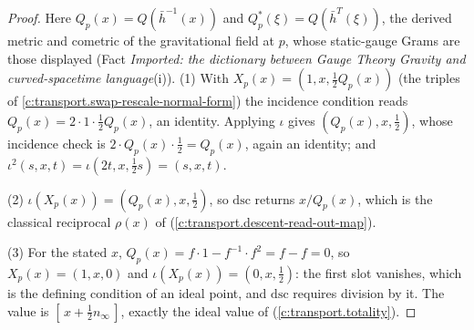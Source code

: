 \documentclass[11pt]{article}
\theoremstyle{definition}
\theoremstyle{plain}
\providecommand{\dsc}{}\renewcommand{\dsc}{\mathrm{dsc}}
\providecommand{\hb}{}\renewcommand{\hb}{\bar{h}}
\providecommand{\nInf}{}\renewcommand{\nInf}{n_\infty}
\begin{document}
\begin{proof}
Here $Q_p(x) = Q(\hb^{-1}(x))$ and $Q^*_p(\xi) = Q(\hb^{T}(\xi))$, the derived metric and cometric of the gravitational field at $p$, whose static-gauge Grams are those displayed (Fact \emph{Imported: the dictionary between Gauge Theory Gravity and curved-spacetime language}(i)). (1) With $X_p(x) = (1, x, \tfrac12 Q_p(x))$ (the triples of \ref{c:transport.swap-rescale-normal-form}) the incidence condition reads $Q_p(x) = 2 \cdot 1 \cdot \tfrac12 Q_p(x)$, an identity. Applying $\iota$ gives $(Q_p(x), x, \tfrac12)$, whose incidence check is $2 \cdot Q_p(x) \cdot \tfrac12 = Q_p(x)$, again an identity; and $\iota^2(s,x,t) = \iota(2t, x, \tfrac12 s) = (s, x, t)$.

(2) $\iota(X_p(x)) = (Q_p(x), x, \tfrac12)$, so $\dsc$ returns $x/Q_p(x)$, which is the classical reciprocal $\rho(x)$ of \cite[Lem.~4.23(2)]{ButlerT1} (\ref{c:transport.descent-read-out-map}).

(3) For the stated $x$, $Q_p(x) = f \cdot 1 - f^{-1} \cdot f^2 = f - f = 0$, so $X_p(x) = (1, x, 0)$ and $\iota(X_p(x)) = (0, x, \tfrac12)$: the first slot vanishes, which is the defining condition of an ideal point, and $\dsc$ requires division by it. The value is $[\,x + \tfrac12 \nInf\,]$, exactly the ideal value of \cite[Thm.~4.10(3)]{ButlerT1} (\ref{c:transport.totality}).


\end{proof}
\end{document}
